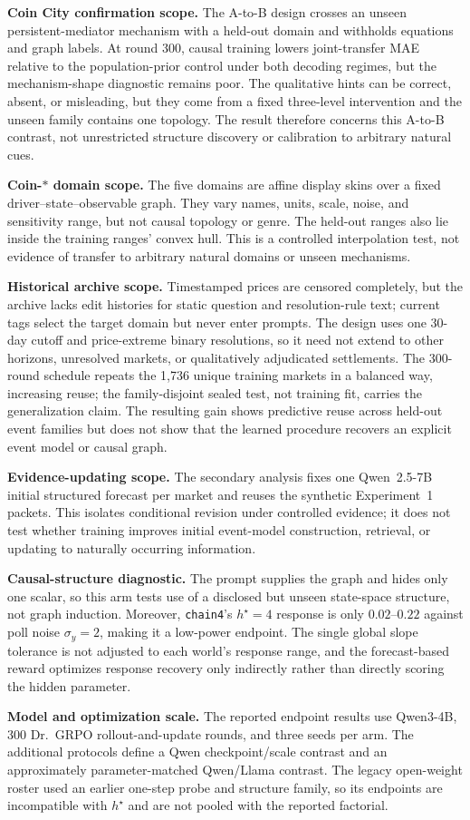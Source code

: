 \textbf{Coin City confirmation scope.} The A-to-B design crosses an unseen
persistent-mediator mechanism with a held-out domain and withholds equations and
graph labels. At round 300, causal training lowers joint-transfer MAE relative to
the population-prior control under both decoding regimes, but the mechanism-shape
diagnostic remains poor. The qualitative hints can be correct, absent, or
misleading, but
they come from a fixed three-level intervention and the unseen family contains one
topology. The result therefore concerns this A-to-B contrast, not unrestricted
structure discovery or calibration to arbitrary natural cues.

\textbf{Coin-$*$ domain scope.} The five domains are affine display skins over a
fixed driver--state--observable graph. They vary names, units, scale, noise, and
sensitivity range, but not causal topology or genre. The held-out ranges also lie
inside the training ranges' convex hull. This is a controlled interpolation test,
not evidence of transfer to arbitrary natural domains or unseen mechanisms.

\textbf{Historical archive scope.} Timestamped prices are censored completely,
but the archive lacks edit histories for static question and resolution-rule
text; current tags select the target domain but never enter prompts. The design
uses one 30-day cutoff and price-extreme binary resolutions, so it need not extend
to other horizons, unresolved markets, or qualitatively adjudicated settlements.
The 300-round schedule repeats the 1,736 unique training markets in a balanced
way, increasing reuse; the family-disjoint sealed test, not training fit, carries
the generalization claim. The resulting gain shows predictive reuse across held-out event families but does
not show that the learned procedure recovers an explicit event model or causal
graph.

\textbf{Evidence-updating scope.} The secondary analysis fixes one Qwen~2.5-7B
initial structured forecast per market and reuses the synthetic Experiment~1
packets. This isolates conditional revision under controlled evidence;
it does not test whether training improves initial event-model construction,
retrieval, or updating to naturally occurring information.

\textbf{Causal-structure diagnostic.} The prompt supplies the graph and hides only
one scalar, so this arm tests use of a disclosed but unseen state-space
structure, not graph induction.
Moreover, \texttt{chain4}'s $h^\star{=}4$ response is only $0.02$--$0.22$ against
poll noise $\sigma_y{=}2$, making it a low-power endpoint. The single global slope
tolerance is not adjusted to each world's response range, and the forecast-based
reward optimizes response recovery only indirectly rather than directly scoring
the hidden parameter.

\textbf{Model and optimization scale.} The reported endpoint results use
Qwen3-4B, 300 Dr.\ GRPO rollout-and-update rounds, and three seeds per arm. The
additional protocols define a Qwen checkpoint/scale contrast and an approximately
parameter-matched Qwen/Llama contrast. The legacy open-weight roster used an
earlier one-step probe and structure family, so its endpoints are incompatible
with $h^\star$ and are not pooled with the reported factorial.
\clearpage

